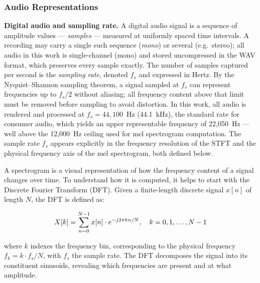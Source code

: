 \subsubsection{Audio Representations}
\label{ssub:audio_representations}

\noindent \textbf{Digital audio and sampling rate.} A digital audio signal is a sequence of amplitude values --- \textit{samples} --- measured at uniformly spaced time intervals. A recording may carry a single such sequence (\textit{mono}) or several (e.g.\ stereo); all audio in this work is single-channel (mono) and stored uncompressed in the WAV format, which preserves every sample exactly. The number of samples captured per second is the \textit{sampling rate}, denoted $f_s$ and expressed in Hertz. By the Nyquist--Shannon sampling theorem, a signal sampled at $f_s$ can represent frequencies up to $f_s / 2$ without aliasing; all frequency content above that limit must be removed before sampling to avoid distortion. In this work, all audio is rendered and processed at $f_s = 44{,}100$~Hz (44.1~kHz), the standard rate for consumer audio, which yields an upper representable frequency of 22{,}050~Hz --- well above the 12{,}000~Hz ceiling used for mel spectrogram computation. The sample rate $f_s$ appears explicitly in the frequency resolution of the STFT and the physical frequency axis of the mel spectrogram, both defined below.

\par \vspace{0.3cm}

A spectrogram is a visual representation of how the frequency content of a signal changes over time. To understand how it is computed, it helps to start with the Discrete Fourier Transform (DFT). Given a finite-length discrete signal $x[n]$ of length $N$, the DFT is defined as:

\begin{equation}
  X[k] = \sum_{n=0}^{N-1} x[n] \cdot e^{-j2\pi kn/N}, \quad k = 0, 1, \ldots, N-1
  \label{eq:dft}\eqname{Discrete Fourier Transform}
\end{equation}

\noindent where $k$ indexes the frequency bin, corresponding to the physical frequency $f_k = k \cdot f_s / N$, with $f_s$ the sample rate. The DFT decomposes the signal into its constituent sinusoids, revealing which frequencies are present and at what amplitude.

\par \vspace{0.3cm}

